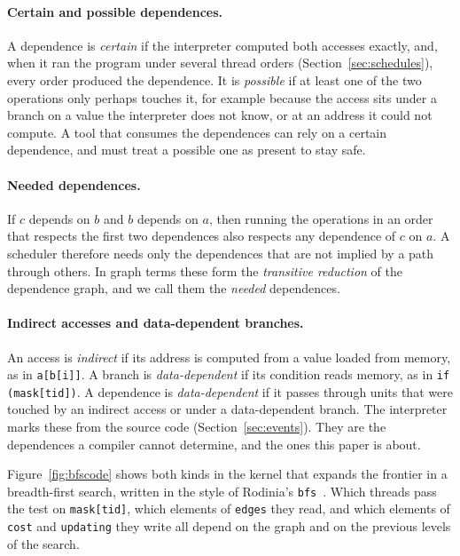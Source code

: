 \documentclass[11pt]{article}
\newcommand{\secref}[1]{Section~\ref{#1}}
\newcommand{\figref}[1]{Figure~\ref{#1}}
\newcommand{\term}[1]{\emph{#1}}
\newcommand{\code}[1]{\texttt{#1}}
\begin{document}
\paragraph{Certain and possible dependences.} A dependence is \term{certain} if the interpreter computed both accesses exactly,
and, when it ran the program under several thread orders (\secref{sec:schedules}), every order produced the
dependence. It is \term{possible} if at least one
of the two operations only perhaps touches it, for example because the access sits under a branch on a value the
interpreter does not know, or at an address it could not compute. A tool that consumes the dependences can rely on
a certain dependence, and must treat a possible one as present to stay safe.

\paragraph{Needed dependences.} If $c$ depends on $b$ and $b$ depends on $a$, then running the operations in an
order that respects the first two dependences also respects any dependence of $c$ on $a$. A scheduler therefore
needs only the dependences that are not implied by a path through others. In graph terms these form the
\term{transitive reduction} of the dependence graph, and we call them the \term{needed} dependences.

\paragraph{Indirect accesses and data-dependent branches.} An access is \term{indirect} if its address is computed
from a value loaded from memory, as in \code{a[b[i]]}. A branch is \term{data-dependent} if its condition reads
memory, as in \code{if (mask[tid])}. A dependence is \term{data-dependent} if it passes through units that were
touched by an indirect access or under a data-dependent branch. The interpreter marks these from the source code
(\secref{sec:events}). They are the dependences a compiler cannot determine, and the ones this paper is about.

\figref{fig:bfscode} shows both kinds in the kernel that expands the frontier in a breadth-first search, written
in the style of Rodinia's \code{bfs}~\cite{Che2009Rodinia}. Which threads pass the test on \code{mask[tid]},
which elements of \code{edges} they read, and which elements of \code{cost} and \code{updating} they write all
depend on the graph and on the previous levels of the search.
\end{document}
